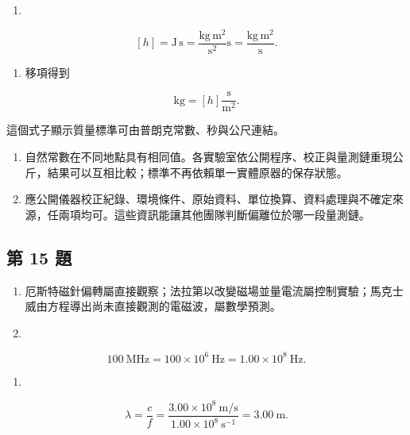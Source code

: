 \documentclass[11pt,a4paper]{article}
\providecommand{\tightlist}{%
  \setlength{\itemsep}{0pt}\setlength{\parskip}{0pt}}
\begin{document}
\begin{enumerate}
\def\labelenumi{(\arabic{enumi})}
\tightlist
\item
\end{enumerate}

\[
[h]=\mathrm{J\,s}
=\frac{\mathrm{kg\,m^2}}{\mathrm{s^2}}\mathrm s
=\frac{\mathrm{kg\,m^2}}{\mathrm s}.
\]

\begin{enumerate}
\def\labelenumi{(\arabic{enumi})}
\setcounter{enumi}{1}
\tightlist
\item
  移項得到
\end{enumerate}

\[
\mathrm{kg}=[h]\frac{\mathrm s}{\mathrm{m^2}}.
\]

這個式子顯示質量標準可由普朗克常數、秒與公尺連結。

\begin{enumerate}
\def\labelenumi{(\arabic{enumi})}
\setcounter{enumi}{2}
\item
  自然常數在不同地點具有相同值。各實驗室依公開程序、校正與量測鏈重現公斤，結果可以互相比較；標準不再依賴單一實體原器的保存狀態。
\item
  應公開儀器校正紀錄、環境條件、原始資料、單位換算、資料處理與不確定來源，任兩項均可。這些資訊能讓其他團隊判斷偏離位於哪一段量測鏈。
\end{enumerate}

\subsection{第 15 題}\label{ux7b2c-15-ux984c}

\begin{enumerate}
\def\labelenumi{(\arabic{enumi})}
\item
  厄斯特磁針偏轉屬直接觀察；法拉第以改變磁場並量電流屬控制實驗；馬克士威由方程導出尚未直接觀測的電磁波，屬數學預測。
\item
\end{enumerate}

\[
100\ \mathrm{MHz}
=100\times10^6\ \mathrm{Hz}
=1.00\times10^8\ \mathrm{Hz}.
\]

\begin{enumerate}
\def\labelenumi{(\arabic{enumi})}
\setcounter{enumi}{2}
\tightlist
\item
\end{enumerate}

\[
\lambda=\frac cf
=\frac{3.00\times10^8\ \mathrm{m/s}}
{1.00\times10^8\ \mathrm{s^{-1}}}
=3.00\ \mathrm m.
\]
\end{document}

